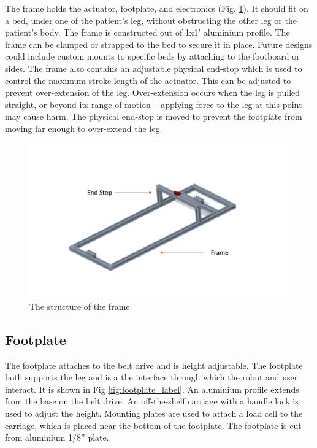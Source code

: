 \documentclass[12pt]{report}
\begin{document}
	The frame holds the actuator, footplate, and electronics (Fig. \ref{fig:frame}). It should fit on a bed, under one of the patient's leg, without obstructing the other leg or the patient's body. The frame is constructed out of 1x1' aluminium profile. The frame can be clamped or strapped to the bed to secure it in place. Future designs could include custom mounts to specific beds by attaching to the footboard or sides. The frame also contains an adjustable physical end-stop which is used to control the maximum stroke length of the actuator. This can be adjusted to prevent over-extension of the leg. Over-extension occurs when the leg is pulled straight, or beyond its range-of-motion -- applying force to the leg at this point may cause harm. The physical end-stop is moved to prevent the footplate from moving far enough to over-extend the leg. 
	

	\begin{figure}[h] 
		\centering
		\includegraphics[width=\linewidth]{frame}
		\caption{The structure of the frame}
		\label{fig:frame}
	\end{figure}
	
	
	
	\subsection{Footplate}
	
	The footplate attaches to the belt drive and is height adjustable. The footplate both supports the leg and is a the interface through which the robot and user interact. It is shown in Fig \ref{fig:footplate_label}. An aluminium profile extends from the base on the belt drive. An off-the-shelf carriage with a handle lock is used to adjust the height. Mounting plates are used to attach a load cell to the carriage, which is placed near the bottom of the footplate. The footplate is cut from aluminium 1/8'' plate. 
	
\end{document}
